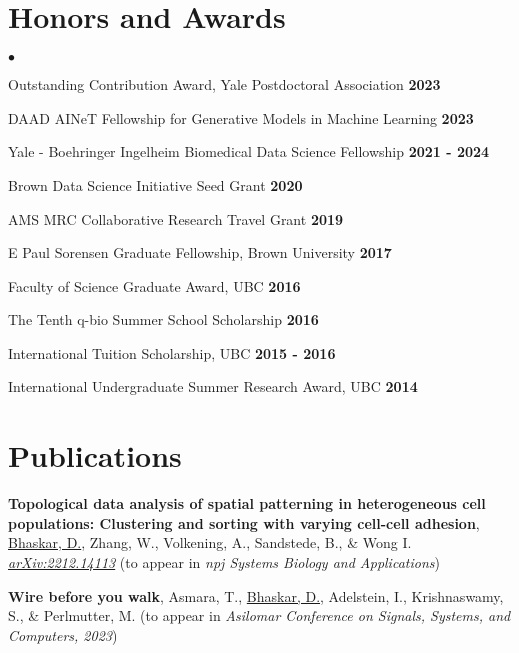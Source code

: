 \documentclass[margin,line]{res}
\newenvironment{list2}{
  \begin{list}{$\bullet$}{
      \setlength{\itemsep}{0in}
      \setlength{\parsep}{0in} \setlength{\parskip}{0in}
      \setlength{\topsep}{0in} \setlength{\partopsep}{0in}
      \setlength{\leftmargin}{0.2in}}}{\end{list}}
\begin{document}
\begin{resume}
\vspace*{.12cm}

\section{\sc Honors and Awards}
\begin{list2}
\setlength\itemsep{0.25em}
\item Outstanding Contribution Award, Yale Postdoctoral Association \hfill {\bf 2023}
\item DAAD AINeT Fellowship for Generative Models in Machine Learning \hfill {\bf 2023}
\item Yale - Boehringer Ingelheim Biomedical Data Science Fellowship \hfill {\bf 2021 - 2024}
\item Brown Data Science Initiative Seed Grant \hfill {\bf 2020}
\item AMS MRC Collaborative Research Travel Grant \hfill {\bf 2019}
\item E Paul Sorensen Graduate Fellowship, Brown University \hfill {\bf 2017}
\item Faculty of Science Graduate Award, UBC \hfill {\bf 2016}
\item The Tenth q-bio Summer School Scholarship \hfill {\bf 2016}
\item International Tuition Scholarship, UBC \hfill {\bf 2015 - 2016}
\item International Undergraduate Summer Research Award, UBC \hfill {\bf 2014}
\end{list2}

\section{\sc Publications}
{
\renewcommand\leftmargini{0em}
\begin{etaremune}[start=17]
\item{\bf Topological data analysis of spatial patterning in heterogeneous cell populations: Clustering and sorting with varying cell-cell adhesion},
\underline{Bhaskar, D.}, Zhang, W., Volkening, A., Sandstede, B., \& Wong I.
\href{https://arxiv.org/abs/2212.14113}{\textit{arXiv:2212.14113}} (to appear in \textit{npj Systems Biology and Applications})
\vspace*{.1cm}
\item{\bf Wire before you walk},
Asmara, T., \underline{Bhaskar, D.}, Adelstein, I., Krishnaswamy, S., \& Perlmutter, M.
(to appear in \textit{Asilomar Conference on Signals, Systems, and Computers, 2023})
\end{etaremune}
} 


\end{resume}
\end{document}
